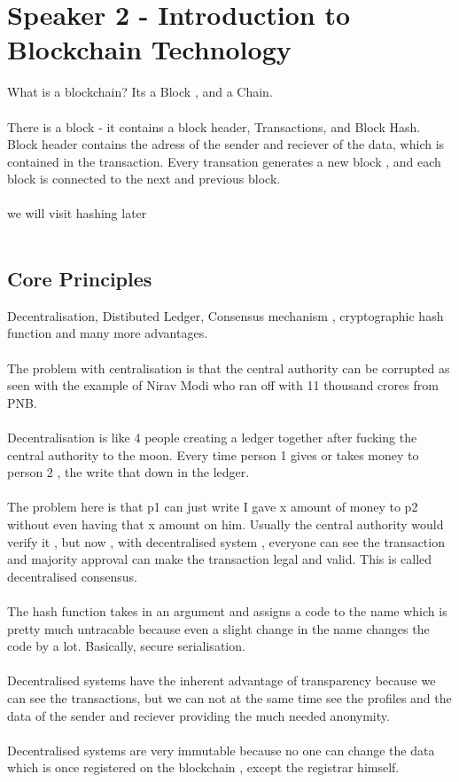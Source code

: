 \documentclass[a4paper,30pt]{report}
\begin{document}
\chapter{Speaker 2 - Introduction to Blockchain Technology} What is a blockchain? Its a Block , and a Chain.\\\\ 
There is a block - it contains a block header, Transactions, and Block Hash. Block header contains the adress of the sender and reciever of the data, which is contained in the transaction. Every transation generates a new block , and each block is connected to the next and previous block.\\\\ 
we will visit hashing later\\\\ 
	\section{Core Principles} Decentralisation, Distibuted Ledger, Consensus mechanism , cryptographic hash function and many more advantages.\\\\ 
		The problem with centralisation is that the central authority can be corrupted as seen with the example of Nirav Modi who ran off with 11 thousand crores from PNB.\\\\ 
		Decentralisation is like 4 people creating a ledger together after fucking the central authority to the moon. Every time person 1 gives or takes money to person 2 , the write that down in the ledger.\\\\ 
		The problem here is that p1 can just write I gave x amount of money to p2 without even having that x amount on him. Usually the central authority would verify it , but now , with decentralised system , everyone can see the transaction and majority approval can make the transaction legal and valid. This is called decentralised consensus.\\\\ 
		The hash function takes in an argument and assigns a code to the name which is pretty much untracable because even a slight change in the name changes the code by a lot. Basically, secure serialisation.\\\\ 
		Decentralised systems have the inherent advantage of transparency because we can see the transactions, but we can not at the same time see the profiles and the data of the sender and reciever providing the much needed anonymity.\\\\ 
		Decentralised systems are very immutable because no one can change the data which is once registered on the blockchain , except the registrar himself.\\\\
\end{document}
